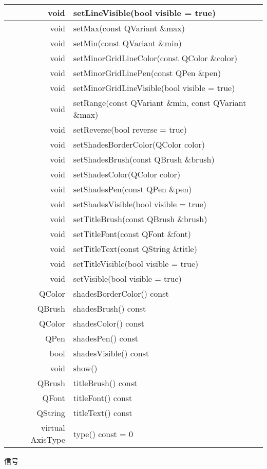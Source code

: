 \begin{longtable}{|r|l|}
\hline
void	&setLineVisible(bool visible = true)\\
\hline
void	&setMax(const QVariant \&max)\\
\hline
void	&setMin(const QVariant \&min)\\
\hline
void	&setMinorGridLineColor(const QColor \&color)\\
\hline
void	&setMinorGridLinePen(const QPen \&pen)\\
\hline
void	&setMinorGridLineVisible(bool visible = true)\\
\hline
void	&setRange(const QVariant \&min, const QVariant \&max)\\
\hline
void	&setReverse(bool reverse = true)\\
\hline
void	&setShadesBorderColor(QColor color)\\
\hline
void	&setShadesBrush(const QBrush \&brush)\\
\hline
void	&setShadesColor(QColor color)\\
\hline
void	&setShadesPen(const QPen \&pen)\\
\hline
void&	setShadesVisible(bool visible = true)\\
\hline
void&	setTitleBrush(const QBrush \&brush)\\
\hline
void&	setTitleFont(const QFont \&font)\\
\hline
void&	setTitleText(const QString \&title)\\
\hline
void&	setTitleVisible(bool visible = true)\\
\hline
void&	setVisible(bool visible = true)\\
\hline
QColor&	shadesBorderColor() const\\
\hline
QBrush&	shadesBrush() const\\
\hline
QColor&	shadesColor() const\\
\hline
QPen&	shadesPen() const\\
\hline
bool&	shadesVisible() const\\
\hline
void&	show()\\
\hline
QBrush&	titleBrush() const\\
\hline
QFont&	titleFont() const\\
\hline
QString&	titleText() const\\
\hline
virtual AxisType &type() const = 0\\
\hline
\end{longtable}

信号

